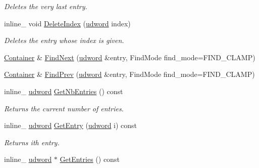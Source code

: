 \begin{DoxyCompactItemize}
\begin{DoxyCompactList}\small\item\em Deletes the very last entry. \end{DoxyCompactList}\item 
\hypertarget{class_container_a2b617daa7417d0aac0646bbf7cc12c1c}{inline\+\_\+ void \hyperlink{class_container_a2b617daa7417d0aac0646bbf7cc12c1c}{Delete\+Index} (\hyperlink{_ice_types_8h_a44c6f1920ba5551225fb534f9d1a1733}{udword} index)}\label{class_container_a2b617daa7417d0aac0646bbf7cc12c1c}

\begin{DoxyCompactList}\small\item\em Deletes the entry whose index is given. \end{DoxyCompactList}\item 
\hyperlink{class_container}{Container} \& \hyperlink{class_container_aba8a86ac1c2a2886e5288ad37140c3d7}{Find\+Next} (\hyperlink{_ice_types_8h_a44c6f1920ba5551225fb534f9d1a1733}{udword} \&entry, Find\+Mode find\+\_\+mode=F\+I\+N\+D\+\_\+\+C\+L\+A\+M\+P)
\item 
\hyperlink{class_container}{Container} \& \hyperlink{class_container_a81363f8e9b925fe4d736fd3f3ab5c879}{Find\+Prev} (\hyperlink{_ice_types_8h_a44c6f1920ba5551225fb534f9d1a1733}{udword} \&entry, Find\+Mode find\+\_\+mode=F\+I\+N\+D\+\_\+\+C\+L\+A\+M\+P)
\item 
\hypertarget{class_container_af970efd22b612ec421c0b3e44a484631}{inline\+\_\+ \hyperlink{_ice_types_8h_a44c6f1920ba5551225fb534f9d1a1733}{udword} \hyperlink{class_container_af970efd22b612ec421c0b3e44a484631}{Get\+Nb\+Entries} () const }\label{class_container_af970efd22b612ec421c0b3e44a484631}

\begin{DoxyCompactList}\small\item\em Returns the current number of entries. \end{DoxyCompactList}\item 
\hypertarget{class_container_a1cf43c7ba75d50806837359a35233a5d}{inline\+\_\+ \hyperlink{_ice_types_8h_a44c6f1920ba5551225fb534f9d1a1733}{udword} \hyperlink{class_container_a1cf43c7ba75d50806837359a35233a5d}{Get\+Entry} (\hyperlink{_ice_types_8h_a44c6f1920ba5551225fb534f9d1a1733}{udword} i) const }\label{class_container_a1cf43c7ba75d50806837359a35233a5d}

\begin{DoxyCompactList}\small\item\em Returns ith entry. \end{DoxyCompactList}\item 
\hypertarget{class_container_a1f1684b828d5eca692962de4f2fa7e63}{inline\+\_\+ \hyperlink{_ice_types_8h_a44c6f1920ba5551225fb534f9d1a1733}{udword} $\ast$ \hyperlink{class_container_a1f1684b828d5eca692962de4f2fa7e63}{Get\+Entries} () const }\label{class_container_a1f1684b828d5eca692962de4f2fa7e63}


\end{DoxyCompactItemize}
